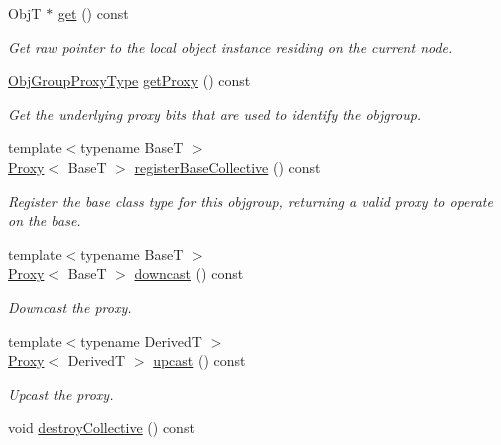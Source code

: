 \begin{DoxyCompactItemize}
ObjT $\ast$ \hyperlink{structvt_1_1objgroup_1_1proxy_1_1_proxy_a62eef779c097c8398e249827e4ad7c6a}{get} () const
\begin{DoxyCompactList}\small\item\em Get raw pointer to the local object instance residing on the current node. \end{DoxyCompactList}\item 
\hyperlink{namespacevt_ad7cae989df485fccca57f0792a880a8e}{Obj\+Group\+Proxy\+Type} \hyperlink{structvt_1_1objgroup_1_1proxy_1_1_proxy_a76cda2351cf7801abe2ebffa1403c5b8}{get\+Proxy} () const
\begin{DoxyCompactList}\small\item\em Get the underlying proxy bits that are used to identify the objgroup. \end{DoxyCompactList}\item 
{\footnotesize template$<$typename BaseT $>$ }\\\hyperlink{structvt_1_1objgroup_1_1proxy_1_1_proxy}{Proxy}$<$ BaseT $>$ \hyperlink{structvt_1_1objgroup_1_1proxy_1_1_proxy_a3504fe25af8c839995a98d445af37282}{register\+Base\+Collective} () const
\begin{DoxyCompactList}\small\item\em Register the base class type for this objgroup, returning a valid proxy to operate on the base. \end{DoxyCompactList}\item 
{\footnotesize template$<$typename BaseT $>$ }\\\hyperlink{structvt_1_1objgroup_1_1proxy_1_1_proxy}{Proxy}$<$ BaseT $>$ \hyperlink{structvt_1_1objgroup_1_1proxy_1_1_proxy_ae672794dc83491200d7f6e794865a6bc}{downcast} () const
\begin{DoxyCompactList}\small\item\em Downcast the proxy. \end{DoxyCompactList}\item 
{\footnotesize template$<$typename DerivedT $>$ }\\\hyperlink{structvt_1_1objgroup_1_1proxy_1_1_proxy}{Proxy}$<$ DerivedT $>$ \hyperlink{structvt_1_1objgroup_1_1proxy_1_1_proxy_a10217747f1bdd8b59e6f5f76290de8e0}{upcast} () const
\begin{DoxyCompactList}\small\item\em Upcast the proxy. \end{DoxyCompactList}\item 
void \hyperlink{structvt_1_1objgroup_1_1proxy_1_1_proxy_a6758c7979d1f69722449cb78f998cbf1}{destroy\+Collective} () const

\end{DoxyCompactItemize}
